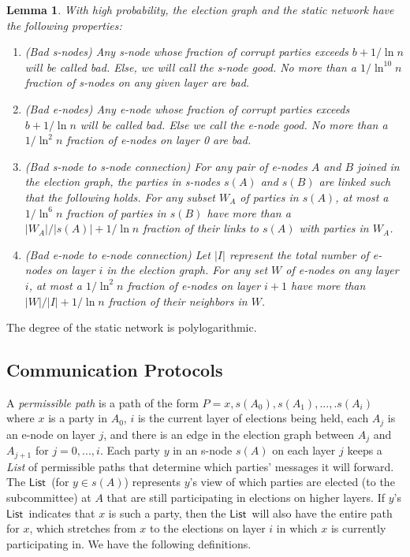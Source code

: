 \documentclass[11pt,letter]{article}
\theoremstyle{mytheoremstyle}
\newtheorem{lemma}{Lemma}
\newcommand{\lst}{\ensuremath{\mathsf{List}}}
\begin{document}
\begin{lemma}
	With high probability, the election graph and the static network have the following properties:
	
	\label{l:network properties}
	\begin{enumerate}
		\item (Bad \textsf{s-node}s) Any \textsf{s-node} whose fraction of corrupt parties exceeds $b+ 1/\ln n$ will be called {\it bad}. Else, we will call the \textsf{s-node} {\it good}. No more than a $1/\ln^{10} n$ fraction of \textsf{s-node}s on any given layer are bad.
		
		\item (Bad \textsf{e-node}s) Any \textsf{e-node} whose fraction of corrupt parties exceeds $b+ 1/\ln n$ will be called {\it bad}. Else we call the \textsf{e-node} {\it good}. No more than a $1/\ln^{2} n$ fraction of
		\textsf{e-node}s on layer 0 are bad.


		\item  (Bad \textsf{s-node} to \textsf{s-node} connection)
For any pair of \textsf{e-node}s $A$ and $B$ joined in the election graph, the parties in \textsf{s-node}s $s(A)$ and $s(B)$ are linked such that the following holds. For any subset $W_A$ of parties in $s(A)$, at most a $1/\ln^6 n$ fraction of parties in $s(B)$ have more than a $|W_A|/|s(A)| + 1/\ln n$ fraction of their links to $s(A)$ with parties in $W_A$.
		
		\item  (Bad \textsf{e-node} to \textsf{e-node} connection) Let $|I|$ represent the total number of \textsf{e-node}s on layer $i$ in the election graph.
For any set $W$ of \textsf{e-node}s on any layer $i$,  at most a $1/\ln^2 n$ fraction of \textsf{e-node}s on layer $i+1$ have more than $|W|/|I| + 1/\ln n$ fraction of their neighbors in $W$.
		
	\end{enumerate}
\end{lemma}

The degree of the static network is polylogarithmic.

\subsection{Communication Protocols} \label{s:low level communication}

A {\em permissible path} is a path of the form $P=x, s(A_0), s(A_1),...,.s(A_i)$ where $x$ is a party in $A_0$, $i$ is the current layer of elections being held, each $A_j$ is an \textsf{e-node} on layer $j$, and there is an edge in the election graph between $A_j$ and $A_{j+1}$ for $j=0,...,i$. Each party $y$ in an \textsf{s-node} $s(A)$ on each layer $j$ keeps a {\em List} of permissible paths that determine which parties' messages it will forward. The \lst\ (for $y\in s(A)$) represents $y$'s view of which parties are elected (to the subcommittee) at $A$ that are still participating in elections on higher layers. If $y$'s \lst\ indicates that $x$ is such a party, then the \lst\ will also have the entire path for $x$, which stretches from $x$ to the elections on layer $i$ in which $x$ is currently participating in. We have the following definitions.
\end{document}
